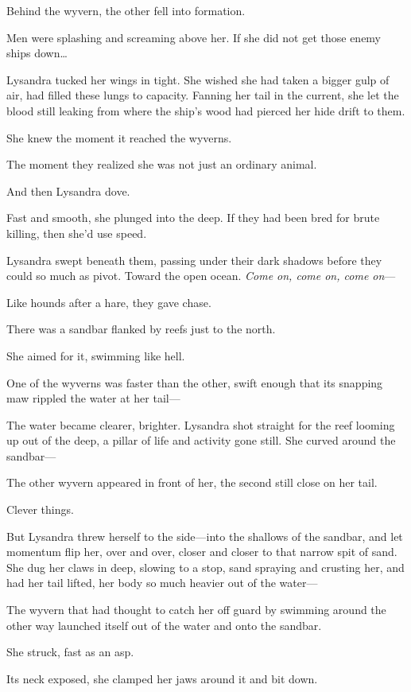 Behind the wyvern, the other fell into formation.

Men were splashing and screaming above her.
If she did not get those enemy ships down\ldots{}

Lysandra tucked her wings in tight.
She wished she had taken a bigger gulp of air, had filled these lungs to capacity.
Fanning her tail in the current, she let the blood still leaking from where the ship's wood had pierced her hide drift to them.

She knew the moment it reached the wyverns.

The moment they realized she was not just an ordinary animal.

And then Lysandra dove.

Fast and smooth, she plunged into the deep.
If they had been bred for brute killing, then she'd use speed.

Lysandra swept beneath them, passing under their dark shadows before they could so much as pivot.
Toward the open ocean.
\emph{Come on, come on, come on}---

Like hounds after a hare, they gave chase.

There was a sandbar flanked by reefs just to the north.

She aimed for it, swimming like hell.

One of the wyverns was faster than the other, swift enough that its snapping maw rippled the water at her tail---

The water became clearer, brighter.
Lysandra shot straight for the reef looming up out of the deep, a pillar of life and activity gone still.
She curved around the sandbar---

The other wyvern appeared in front of her, the second still close on her tail.

Clever things.

But Lysandra threw herself to the side---into the shallows of the sandbar, and let momentum flip her, over and over, closer and closer to that narrow spit of sand.
She dug her claws in deep, slowing to a stop, sand spraying and crusting her, and had her tail lifted, her body so much heavier out of the water---

The wyvern that had thought to catch her off guard by swimming around the other way launched itself out of the water and onto the sandbar.

She struck, fast as an asp.

Its neck exposed, she clamped her jaws around it and bit down.

